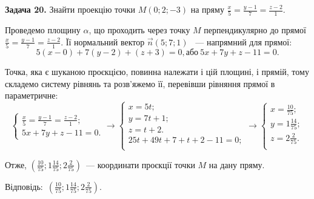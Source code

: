 \documentclass[14pt,draft]{extreport}
\begin{document}
\bigskip \textbf{Задача 20.} Знайти проекцію точки $M(0;2;-3)$
на пряму
$\frac{x}{5}=\frac{y-1}{7}=\frac{z-2}{1}.$\bigskip

%

Проведемо площину $\alpha$, що проходить через точку $M$
перпендикулярно до прямої
$\frac{x}{5}=\frac{y-1}{7}=\frac{z-2}{1}.$
Її нормальний вектор $\vec n(5;7;1)$
~--- напрямний для прямої:
\begin{equation}
	5(x-0)+7(y-2)+(z+3)=0, \text{або}~
	5x+7y+z-11=0.
\end{equation}

Точка, яка є шуканою проєкцією, повинна належати
і цій площині, і прямій, тому складемо систему
рівнянь та розв'яжемо її, перевівши рівняння прямої
в параметричне:
\begin{equation}
\begin{cases}
	\frac{x}{5}=\frac{y-1}{7}=\frac{z-2}{1};\\
	5x+7y+z-11=0.
\end{cases}\to
\begin{cases}
	x=5t;\\
	y=7t+1;\\
	z=t+2.\\
	25t+49t+7+t+2-11=0;\\
\end{cases}\to
\begin{cases}
	x=\frac{10}{75};\\
	y=1\frac{14}{75};\\
	z=2\frac{2}{75}.\\
\end{cases}
\end{equation}

Отже, $(\frac{10}{75};
	1\frac{14}{75};
	2\frac{2}{75})$~---
координати проєкції точки $M$ на дану пряму.

\null\hfill
\begin{boxedminipage}{0.32\textwidth}
	Відповідь:~$(\frac{10}{75};
	1\frac{14}{75};
	2\frac{2}{75})$.
\end{boxedminipage}
\end{document}
